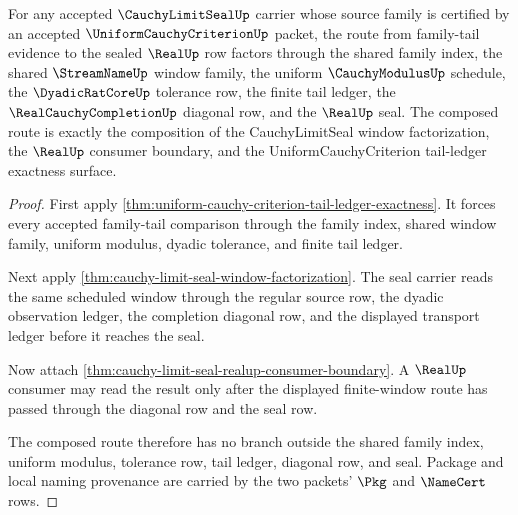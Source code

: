 \begin{theorem}
\label{thm:cauchy-limit-seal-uniform-tail-seal-route}
For any accepted $\CauchyLimitSealUp$ carrier whose source family is certified
by an accepted $\UniformCauchyCriterionUp$ packet, the route from family-tail
evidence to the sealed $\RealUp$ row factors through the shared family index,
the shared $\StreamNameUp$ window family, the uniform $\CauchyModulusUp$
schedule, the $\DyadicRatCoreUp$ tolerance row, the finite tail ledger, the
$\RealCauchyCompletionUp$ diagonal row, and the $\RealUp$ seal. The composed
route is exactly the composition of the CauchyLimitSeal window factorization,
the $\RealUp$ consumer boundary, and the UniformCauchyCriterion tail-ledger
exactness surface.
\end{theorem}
\begin{proof}
First apply \autoref{thm:uniform-cauchy-criterion-tail-ledger-exactness}. It
forces every accepted family-tail comparison through the family index, shared
window family, uniform modulus, dyadic tolerance, and finite tail ledger.

Next apply \autoref{thm:cauchy-limit-seal-window-factorization}. The seal
carrier reads the same scheduled window through the regular source row, the
dyadic observation ledger, the completion diagonal row, and the displayed
transport ledger before it reaches the seal.

Now attach \autoref{thm:cauchy-limit-seal-realup-consumer-boundary}. A
$\RealUp$ consumer may read the result only after the displayed finite-window
route has passed through the diagonal row and the seal row.

The composed route therefore has no branch outside the shared family index,
uniform modulus, tolerance row, tail ledger, diagonal row, and seal. Package
and local naming provenance are carried by the two packets' $\Pkg$ and
$\NameCert$ rows.
\end{proof}

